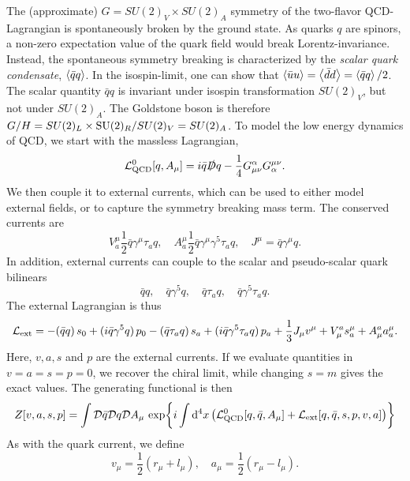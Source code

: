 The (approximate) $G = SU(2)_V\times SU(2)_A$ symmetry of the two-flavor QCD-Lagrangian is spontaneously broken by the ground state.
As quarks $q$ are spinors, a non-zero expectation value of the quark field would break Lorentz-invariance.
Instead, the spontaneous symmetry breaking is characterized by the \emph{scalar quark condensate}, $\ex{\bar q q}$.
In the isospin-limit, one can show that $\ex{\bar u u } = \ex{\bar d d} = \ex{\bar q q} / 2$.
The scalar quantity $\bar q q$ is invariant under isospin transformation $SU(2)_V$, but not under $SU(2)_A$.
The Goldstone boson is therefore $G/H = SU(2)_L\times\mathrm{SU}(2)_R/SU(2)_V = SU(2)_A$.
To model the low energy dynamics of QCD, we start with the massless Lagrangian,
\begin{equation}
    \mathcal{L}^0_\mathrm{QCD}[q, A_\mu] = i \bar q \slashed{D} q - \frac{1}{4}G_{\mu \nu}^\alpha G^{\mu \nu}_\alpha.
\end{equation}
We then couple it to external currents, which can be used to either model external fields, or to capture the symmetry breaking mass term.
The conserved currents are
\begin{equation}
    V_a^\mu \frac{1}{2} \bar q \gamma^\mu \tau_a q, \quad
    A_a^\mu \frac{1}{2} \bar q \gamma^\mu \gamma^5 \tau_a q, \quad
    J^\mu = \bar q \gamma^\mu q.
\end{equation}
In addition, external currents can couple to the scalar and pseudo-scalar quark bilinears
\begin{equation}
    \bar q q, \quad \bar q \gamma^5 q, 
    \quad \bar q \tau_a q, \quad \bar q \gamma^5 \tau_a q.
\end{equation}
The external Lagrangian is thus
\begin{equation}
    \mathcal{L}_\text{ext} 
    = 
    - (\bar q q )\, s_0 + (i \bar q \gamma^5 q) \, p_0
    - (\bar q \tau_a q)\, s_a + (i \bar q \gamma^5 \tau_a q) \, p_a
    + \frac{1}{3} J_\mu v^\mu 
    + V_\mu^a s_a^\mu + A_\mu^a a_a^\mu.
\end{equation}
Here, $v, a, s$ and $p$ are the external currents. 
If we evaluate quantities in $v = a = s = p = 0$, we recover the chiral limit, while changing $s = m$ gives the exact values.
The generating functional is then
\begin{equation}
    Z[v, a, s, p] 
    = 
    \int \mathcal{D} \bar q \mathcal{D} q \mathcal{D} A_\mu \, 
    \exp{
        i \int \dd^4 x 
        \left( 
            \mathcal{L}^0_\text{QCD}[q, \bar q, A_\mu] + \mathcal{L}_\text{ext}[q, \bar q, s, p, v, a]
        \right)
    }
\end{equation}
As with the quark current, we define
\begin{equation}
    v_\mu = \frac{1}{2}(r_\mu + l_\mu),
    \quad
    a_\mu = \frac{1}{2}(r_\mu - l_\mu).
\end{equation}

